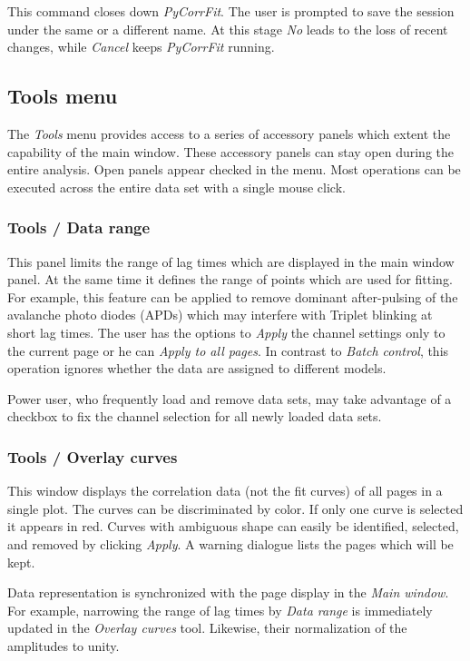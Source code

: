This command closes down \textit{PyCorrFit}. The user is prompted to save the session under the same or a different name. At this stage \textit{No} leads to the loss of recent changes, while \textit{Cancel} keeps \textit{PyCorrFit} running.

\subsection{Tools menu}

The \textit{Tools} menu provides access to a series of accessory panels which extent the capability of the main window. These accessory panels can stay open during the entire analysis. Open panels appear checked in the menu. Most operations can be executed across the entire data set with a single mouse click. 

\subsubsection{Tools / Data range}

This panel limits the range of lag times which are displayed in the main window panel. At the same time it defines the range of points which are used for fitting. For example, this feature can be applied to remove dominant after-pulsing of the avalanche photo diodes (APDs) which may interfere with Triplet blinking at short lag times. The user has the options to \textit{Apply} the channel settings only to the current page or he can \textit{Apply to all pages}. In contrast to \textit{Batch control}, this operation ignores whether the data are assigned to different models. 

Power user, who frequently load and remove data sets, may take advantage of a checkbox to fix the channel selection for all newly loaded data sets.

\subsubsection{Tools / Overlay curves}

This window displays the correlation data (not the fit curves) of all pages in a single plot. The curves can be discriminated by color. If only one curve is selected it appears in red. Curves with ambiguous shape can easily be identified, selected, and removed by clicking \textit{Apply}. A warning dialogue lists the pages which will be kept.

Data representation is synchronized with the page display in the \textit{Main window}. For example, narrowing the range of lag times by \textit{Data range }is immediately updated in the \textit{Overlay curves }tool. Likewise, their normalization of the amplitudes to unity.

